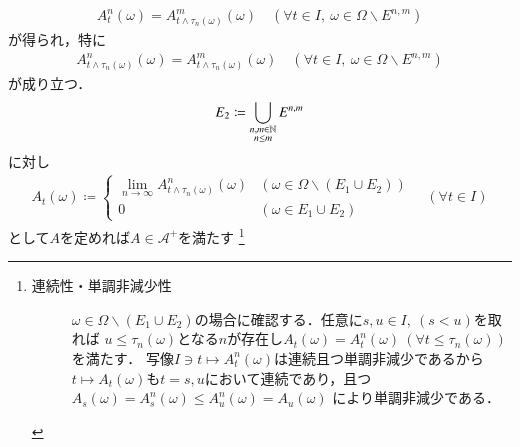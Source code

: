 \begin{prf}
\begin{description}
				\begin{align}
					A_t^n(\omega) = A_{t \wedge \tau_n(\omega)}^m(\omega) \quad (\forall t \in I,\ \omega \in \Omega \backslash E^{n,m})
				\end{align}
				が得られ，特に
				\begin{align}
					A_{t \wedge \tau_n(\omega)}^n(\omega) = A_{t \wedge \tau_n(\omega)}^m(\omega) \quad (\forall t \in I,\ \omega \in \Omega \backslash E^{n,m})
				\end{align}
				が成り立つ．
				\begin{align}
					E_2 \coloneqq \bigcup_{\substack{n,m \in \mathbb{N} \\ n \leq m}} E^{n,m}
				\end{align}
				に対し
				\begin{align}
					A_t(\omega) \coloneqq
					\begin{cases}
						\lim_{n \to \infty} A_{t \wedge \tau_n(\omega)}^n(\omega) & (\omega \in \Omega \backslash (E_1 \cup E_2)) \\
						0 & (\omega \in E_1 \cup E_2)
					\end{cases}
					\quad (\forall t \in I)
				\end{align}
				として$A$を定めれば$A \in \mathcal{A}^+$を満たす
				\footnote{
					\begin{description}
						\item[連続性・単調非減少性]
							$\omega \in \Omega \backslash (E_1 \cup E_2)$の場合に確認する．任意に$s,u \in I,\ (s < u)$を取れば
							$u \leq \tau_n(\omega)$となる$n$が存在し$A_t(\omega) = A_t^n(\omega)\ (\forall t \leq \tau_n(\omega))$を満たす．
							写像$I \ni t \longmapsto A_t^n(\omega)$は連続且つ単調非減少であるから
							$t \longmapsto A_t(\omega)$も$t = s,u$において連続であり，且つ$A_s(\omega) = A_s^n(\omega) \leq A_u^n(\omega) = A_u(\omega)$
							により単調非減少である．
						

\end{description}}
\end{description}
\end{prf}
